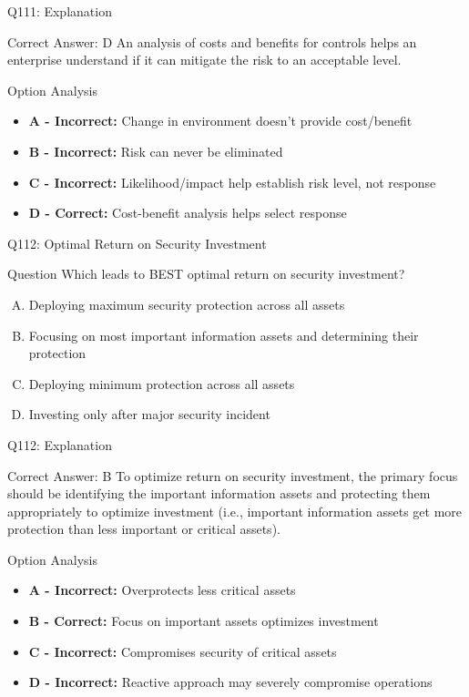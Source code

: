 \documentclass{beamer}
\begin{document}
	\begin{frame}{Q111: Explanation}
		\begin{block}{Correct Answer: D}
			An analysis of costs and benefits for controls helps an enterprise understand if it can mitigate the risk to an acceptable level.
		\end{block}
		\begin{block}{Option Analysis}
			\begin{itemize}
				\item \textbf{A - Incorrect:} Change in environment doesn't provide cost/benefit
				\item \textbf{B - Incorrect:} Risk can never be eliminated
				\item \textbf{C - Incorrect:} Likelihood/impact help establish risk level, not response
				\item \textbf{D - Correct:} Cost-benefit analysis helps select response
			\end{itemize}
		\end{block}
	\end{frame}
	
	\begin{frame}{Q112: Optimal Return on Security Investment}
		\begin{block}{Question}
			Which leads to BEST optimal return on security investment?
		\end{block}
		\begin{enumerate}[(A)]
			\item Deploying maximum security protection across all assets
			\item Focusing on most important information assets and determining their protection
			\item Deploying minimum protection across all assets
			\item Investing only after major security incident
		\end{enumerate}
	\end{frame}
	
	\begin{frame}{Q112: Explanation}
		\begin{block}{Correct Answer: B}
			To optimize return on security investment, the primary focus should be identifying the important information assets and protecting them appropriately to optimize investment (i.e., important information assets get more protection than less important or critical assets).
		\end{block}
		\begin{block}{Option Analysis}
			\begin{itemize}
				\item \textbf{A - Incorrect:} Overprotects less critical assets
				\item \textbf{B - Correct:} Focus on important assets optimizes investment
				\item \textbf{C - Incorrect:} Compromises security of critical assets
				\item \textbf{D - Incorrect:} Reactive approach may severely compromise operations
			\end{itemize}
		\end{block}
	\end{frame}
	
\end{document}
